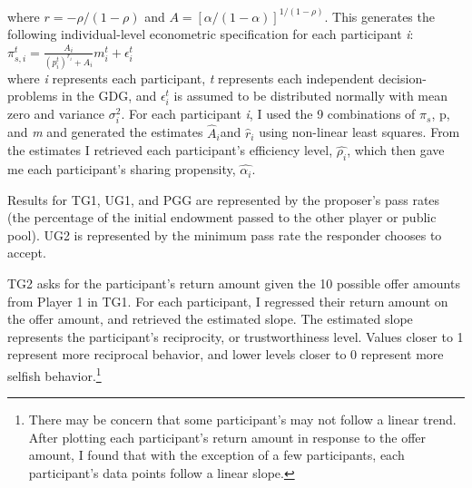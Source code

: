 \documentclass[12pt]{article}
\begin{document}
 \noindent
where \(r=-\rho / (1-\rho) \) and \(A=[\alpha / (1-\alpha)]^{1/(1-\rho)} \). This generates the following individual-level econometric specification for each participant \textit{i}: \\
 
\( \pi^{t}_{s,i} = \frac{A_{i}}{(p^{t}_{i})^{r_{i}} + A_{i}}m^{t}_{i} + \epsilon^{t}_{i}\) \\
 
\noindent
where \textit{i} represents each participant, \textit{t} represents each independent decision-problems in the GDG, and \( \epsilon^{t}_{i} \) is assumed to be distributed normally with mean zero and variance \(\sigma^{2}_{i}\). For each participant \textit{i}, I used the 9 combinations of \(\pi_{s}\), p, and \textit{m} and generated the estimates \( \hat{A}_{i} \)and \( \hat{r}_{i} \) using non-linear least squares. From the estimates I retrieved each participant\rq s efficiency level, \( \hat{\rho_{i}}\), which then gave me each participant\rq s sharing propensity, \( \hat{\alpha_{i}} \).

{\color{red}Results for TG1, UG1, and PGG are represented by the proposer\rq s pass rates (the percentage of the initial endowment passed to the other player or public pool). UG2 is represented by the minimum pass rate the responder chooses to accept. }

TG2 asks for the participant\rq s return amount given the 10 possible offer amounts from Player 1 in TG1. For each participant, I regressed their return amount on the offer amount, and retrieved the estimated slope. The estimated slope represents the participant\rq s reciprocity, or trustworthiness level. Values closer to 1 represent more reciprocal behavior, and lower levels closer to 0 represent more selfish behavior.\footnote{There may be concern that some participant\rq s may not follow a linear trend. After plotting each participant\rq s return amount in response to the offer amount, I found that with the exception of a few participants, each participant\rq s data points follow a linear slope.}
\end{document}
